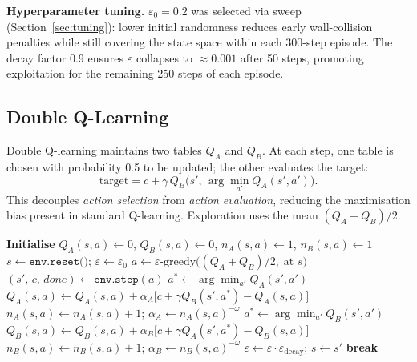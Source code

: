 \documentclass[11pt]{article}
\begin{document}
\textbf{Hyperparameter tuning.}  $\varepsilon_0=0.2$ was selected via sweep
(Section~\ref{sec:tuning}): lower initial randomness reduces early wall-collision
penalties while still covering the state space within each 300-step episode.
The decay factor 0.9 ensures $\varepsilon$ collapses to ${\approx}0.001$ after
50 steps, promoting exploitation for the remaining 250 steps of each episode.

\subsection{Double Q-Learning}

Double Q-learning maintains two tables $Q_A$ and $Q_B$.
At each step, one table is chosen with probability 0.5 to be updated; the
other evaluates the target:
\begin{equation}
    \text{target} = c + \gamma\, Q_B\!\bigl(s',\, \arg\min_{a'} Q_A(s',a')\bigr).
\end{equation}
This decouples \emph{action selection} from \emph{action evaluation},
reducing the maximisation bias present in standard Q-learning.  Exploration
uses the mean $(Q_A+Q_B)/2$.

\begin{algorithm}[H]
\caption{Double Q-Learning}
\label{alg:doubleq}
\begin{algorithmic}[1]
\State \textbf{Initialise} $Q_A(s,a)\leftarrow 0$, $Q_B(s,a)\leftarrow 0$,\;
       $n_A(s,a)\leftarrow 1$, $n_B(s,a)\leftarrow 1$
    \State $s \leftarrow \texttt{env.reset()}$;\; $\varepsilon \leftarrow \varepsilon_0$
        \State $a \leftarrow \varepsilon\text{-greedy}\!\bigl((Q_A+Q_B)/2,\;\text{at }s\bigr)$
        \State $(s',\, c,\, \textit{done}) \leftarrow \texttt{env.step}(a)$
         
            \State $a^* \leftarrow \arg\min_{a'} Q_A(s',a')$
            \State $Q_A(s,a) \leftarrow Q_A(s,a) + \alpha_A\bigl[c + \gamma Q_B(s',a^*) - Q_A(s,a)\bigr]$
            \State $n_A(s,a)\leftarrow n_A(s,a)+1$;\; $\alpha_A \leftarrow n_A(s,a)^{-\omega}$
        \Else {}
            \State $a^* \leftarrow \arg\min_{a'} Q_B(s',a')$
            \State $Q_B(s,a) \leftarrow Q_B(s,a) + \alpha_B\bigl[c + \gamma Q_A(s',a^*) - Q_B(s,a)\bigr]$
            \State $n_B(s,a)\leftarrow n_B(s,a)+1$;\; $\alpha_B \leftarrow n_B(s,a)^{-\omega}$
        \EndIf
        \State $\varepsilon\leftarrow\varepsilon\cdot\varepsilon_{\text{decay}}$;\; $s\leftarrow s'$
         \textbf{break} \EndIf
    \EndFor
\EndFor
\end{algorithmic}
\end{algorithm}
\end{document}

